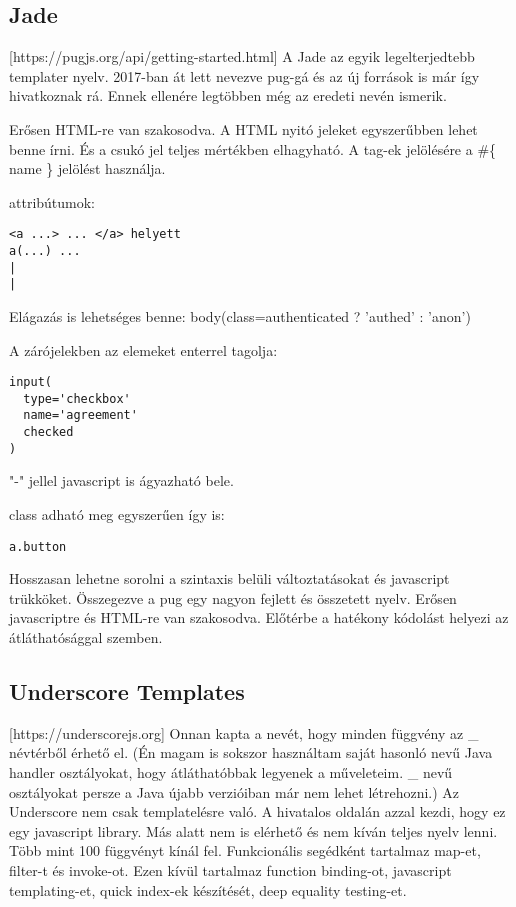 \subsection{Jade}
[https://pugjs.org/api/getting-started.html]
A Jade az egyik legelterjedtebb templater nyelv.
2017-ban át lett nevezve pug-gá és az új források is már így hivatkoznak rá.
Ennek ellenére legtöbben még az eredeti nevén ismerik.

Erősen HTML-re van szakosodva.
A HTML nyitó jeleket egyszerűbben lehet benne írni.
És a csukó jel teljes mértékben elhagyható.
A tag-ek jelölésére a \#\{ name \} jelölést használja.


attribútumok:
\begin{verbatim}
<a ...> ... </a> helyett 
a(...) ...
|
|
\end{verbatim}

Elágazás is lehetséges benne: body(class=authenticated ? 'authed' : 'anon')

A zárójelekben az elemeket enterrel tagolja:
\begin{verbatim}
input(
  type='checkbox'
  name='agreement'
  checked
)
\end{verbatim}

"-" jellel javascript is ágyazható bele.

class adható meg egyszerűen így is:
\begin{verbatim}
a.button
\end{verbatim}

Hosszasan lehetne sorolni a szintaxis belüli változtatásokat és javascript trükköket.
Összegezve a pug egy nagyon fejlett és összetett nyelv.
Erősen javascriptre és HTML-re van szakosodva.
Előtérbe a hatékony kódolást helyezi az átláthatósággal szemben.


\subsection{Underscore Templates}
[https://underscorejs.org]
Onnan kapta a nevét, hogy minden függvény az \_ névtérből érhető el.
(Én magam is sokszor használtam saját hasonló nevű Java handler osztályokat, hogy átláthatóbbak legyenek a műveleteim. 
\_ nevű osztályokat persze a Java újabb verzióiban már nem lehet létrehozni.)
Az Underscore nem csak templatelésre való.
A hivatalos oldalán azzal kezdi, hogy ez egy javascript library.
Más alatt nem is elérhető és nem kíván teljes nyelv lenni.
Több mint 100 függvényt kínál fel.
Funkcionális segédként tartalmaz map-et, filter-t és invoke-ot.
Ezen kívül tartalmaz function binding-ot, javascript templating-et, quick index-ek készítését, deep equality testing-et.

